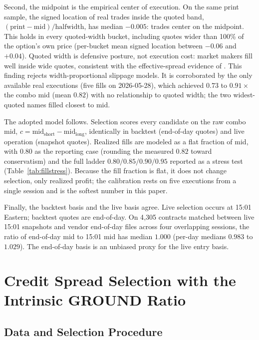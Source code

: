 \documentclass[11pt]{article}
\begin{document}
Second, the midpoint is the empirical center of execution. On the same print
sample, the signed location of real trades inside the quoted band,
$(\mathrm{print} - \mathrm{mid})/\mathrm{halfwidth}$, has median $-0.005$:
trades center on the midpoint. This holds in every quoted-width bucket,
including quotes wider than 100\% of the option's own price (per-bucket mean
signed location between $-0.06$ and $+0.04$). Quoted width is defensive
posture, not execution cost: market makers fill well inside wide quotes,
consistent with the effective-spread evidence of \cite{muravyev2020}. This
finding rejects width-proportional slippage models. It is corroborated by the
only available real executions (five fills on 2026-05-28), which achieved
$0.73$ to $0.91\times$ the combo mid (mean $0.82$) with no relationship to
quoted width; the two widest-quoted names filled closest to mid.

The adopted model follows. Selection scores every candidate on the raw combo
mid, $c = \mathrm{mid}_{\mathrm{short}} - \mathrm{mid}_{\mathrm{long}}$,
identically in backtest (end-of-day quotes) and live operation (snapshot
quotes). Realized fills are modeled as a flat fraction of mid, with $0.80$ as
the reporting case (rounding the measured $0.82$ toward conservatism) and the
full ladder $0.80/0.85/0.90/0.95$ reported as a stress test
(Table~\ref{tab:fillstress}). Because the fill fraction is flat, it does not
change selection, only realized profit; the calibration rests on five
executions from a single session and is the softest number in this paper.

Finally, the backtest basis and the live basis agree. Live selection occurs
at 15:01 Eastern; backtest quotes are end-of-day. On 4{,}305 contracts matched
between live 15:01 snapshots and vendor end-of-day files across four
overlapping sessions, the ratio of end-of-day mid to 15:01 mid has median
$1.000$ (per-day medians $0.983$ to $1.029$). The end-of-day basis is an
unbiased proxy for the live entry basis.

\section{Credit Spread Selection with the Intrinsic GROUND Ratio}
\label{sec:results}

\subsection{Data and Selection Procedure}
\label{sec:design}
\end{document}
